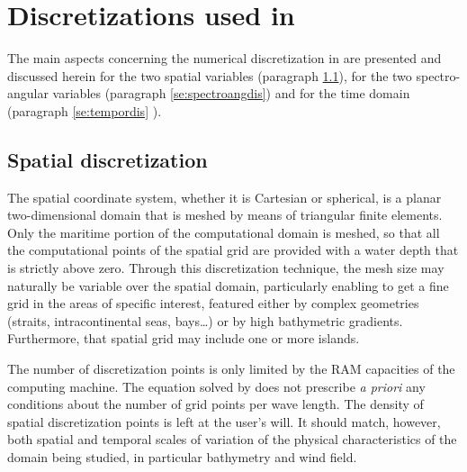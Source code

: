 

\chapter{ Discretizations used in \tomawac}

 The main aspects concerning the numerical discretization in \tomawac are presented and discussed herein for the two spatial variables (paragraph \ref{se:spatialdis}), for the two spectro-angular variables (paragraph \ref{se:spectroangdis}) and for the time domain (paragraph \ref{se:tempordis}
).


\section{ Spatial discretization}
\label{se:spatialdis}
 The spatial coordinate system, whether it is Cartesian or spherical, is a planar two-dimensional domain that is meshed by means of triangular finite elements. Only the maritime portion of the computational domain is meshed, so that all the computational points of the spatial grid are provided with a water depth that is strictly above zero. Through this discretization technique, the mesh size may naturally be variable over the spatial domain, particularly enabling to get a fine grid in the areas of specific interest, featured either by complex geometries (straits, intracontinental seas, bays\dots ) or by high bathymetric gradients. Furthermore, that spatial grid may include one or more islands.

 The number of discretization points is only limited by the RAM capacities of the computing machine. The equation solved by \tomawac does not prescribe \textit{a priori }any conditions about the number of grid points per wave length. The density of spatial discretization points is left at the user's will. It should match, however, both spatial and temporal scales of variation of the physical characteristics of the domain being studied, in particular bathymetry and wind field.

